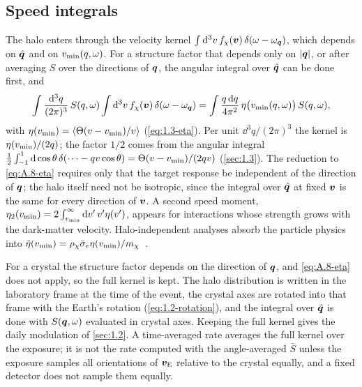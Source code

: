\subsection{Speed integrals}

The halo enters through the velocity kernel $\int\mathrm{d}^3v\,f_\chi(\bm{v})\,\delta(\omega - \omega_{\bm{q}})$, which depends on $\hat{\bm{q}}$ and on $v_{\mathrm{min}}(q,\omega)$. For a structure factor that depends only on $|\bm{q}|$, or after averaging $S$ over the directions of $\bm{q}$, the angular integral over $\hat{\bm{q}}$ can be done first, and
\begin{equation}
  \int\frac{\mathrm{d}^3q}{(2\pi)^3}\,S(q,\omega)\int\mathrm{d}^3v\,f_\chi(\bm{v})\,\delta(\omega - \omega_{\bm{q}})
  = \int\frac{q\,\mathrm{d} q}{4\pi^2}\,\eta\bigl(v_{\mathrm{min}}(q,\omega)\bigr)\,S(q,\omega),
  \label{eq:A.8-eta}
\end{equation}
with $\eta(v_{\mathrm{min}}) = \langle\Theta(v - v_{\mathrm{min}})/v\rangle$ (\cref{eq:1.3-eta}). Per unit $\dd^3q/(2\pi)^3$ the kernel is $\eta(v_{\mathrm{min}})/(2q)$; the factor $1/2$ comes from the angular integral $\tfrac12\int_{-1}^{1}\mathrm{d}\cos\theta\,\delta(\cdots - qv\cos\theta) = \Theta(v - v_{\mathrm{min}})/(2qv)$ (\cref{sec:1.3}). The reduction to \cref{eq:A.8-eta} requires only that the target response be independent of the direction of $\bm{q}$; the halo itself need not be isotropic, since the integral over $\hat{\bm{q}}$ at fixed $\bm{v}$ is the same for every direction of $\bm{v}$. A second speed moment, $\eta_2(v_{\mathrm{min}}) = 2\int_{v_{\mathrm{min}}}^\infty\mathrm{d} v'\,v'\eta(v')$, appears for interactions whose strength grows with the dark-matter velocity. Halo-independent analyses absorb the particle physics into $\tilde\eta(v_{\mathrm{min}}) = \rho_\chi\bar{\sigma}_{e}\eta(v_{\mathrm{min}})/m_\chi$~\cite[Eq.~(2.8)]{bernreuther2024extracting}.

For a crystal the structure factor depends on the direction of $\bm{q}$, and \cref{eq:A.8-eta} does not apply, so the full kernel is kept. The halo distribution is written in the laboratory frame at the time of the event, the crystal axes are rotated into that frame with the Earth's rotation (\cref{eq:1.2-rotation}), and the integral over $\hat{\bm{q}}$ is done with $S(\bm{q},\omega)$ evaluated in crystal axes. Keeping the full kernel gives the daily modulation of \cref{sec:1.2}. A time-averaged rate averages the full kernel over the exposure; it is not the rate computed with the angle-averaged $\bar S$ unless the exposure samples all orientations of $\bm{v}_{\mathrm{E}}$ relative to the crystal equally, and a fixed detector does not sample them equally.

